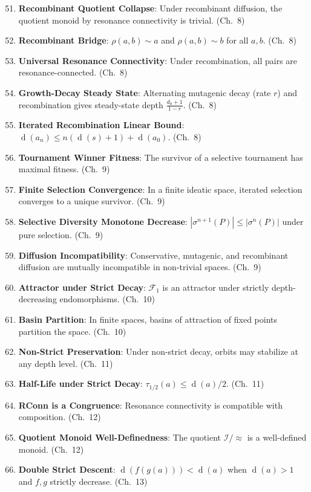 \documentclass[11pt,openany]{book}
\theoremstyle{definition}
\theoremstyle{plain}
\theoremstyle{remark}
\newcommand{\IS}{\mathcal{I}}               %
\newcommand{\res}{\sim}                      %
\newcommand{\depth}{\operatorname{d}}       %
\newcommand{\Filt}[1]{\mathcal{F}_{#1}}     %
\begin{document}
\begin{enumerate}
\setcounter{enumi}{50}
\item \textbf{Recombinant Quotient Collapse}: Under recombinant diffusion, the quotient monoid by resonance connectivity is trivial. (Ch.~8)
\item \textbf{Recombinant Bridge}: $\rho(a,b) \res a$ and $\rho(a,b) \res b$ for all $a, b$. (Ch.~8)
\item \textbf{Universal Resonance Connectivity}: Under recombination, all pairs are resonance-connected. (Ch.~8)
\item \textbf{Growth-Decay Steady State}: Alternating mutagenic decay (rate $r$) and recombination gives steady-state depth $\frac{d_0+1}{1-r}$. (Ch.~8)
\item \textbf{Iterated Recombination Linear Bound}: $\depth(a_n) \leq n(\depth(s)+1) + \depth(a_0)$. (Ch.~8)
\item \textbf{Tournament Winner Fitness}: The survivor of a selective tournament has maximal fitness. (Ch.~9)
\item \textbf{Finite Selection Convergence}: In a finite ideatic space, iterated selection converges to a unique survivor. (Ch.~9)
\item \textbf{Selective Diversity Monotone Decrease}: $|\sigma^{n+1}(P)| \leq |\sigma^n(P)|$ under pure selection. (Ch.~9)
\item \textbf{Diffusion Incompatibility}: Conservative, mutagenic, and recombinant diffusion are mutually incompatible in non-trivial spaces. (Ch.~9)
\item \textbf{Attractor under Strict Decay}: $\Filt{1}$ is an attractor under strictly depth-decreasing endomorphisms. (Ch.~10)
\item \textbf{Basin Partition}: In finite spaces, basins of attraction of fixed points partition the space. (Ch.~10)
\item \textbf{Non-Strict Preservation}: Under non-strict decay, orbits may stabilize at any depth level. (Ch.~11)
\item \textbf{Half-Life under Strict Decay}: $\tau_{1/2}(a) \leq \depth(a)/2$. (Ch.~11)
\item \textbf{RConn is a Congruence}: Resonance connectivity is compatible with composition. (Ch.~12)
\item \textbf{Quotient Monoid Well-Definedness}: The quotient $\IS/{\approx}$ is a well-defined monoid. (Ch.~12)
\item \textbf{Double Strict Descent}: $\depth(f(g(a))) < \depth(a)$ when $\depth(a) > 1$ and $f, g$ strictly decrease. (Ch.~13)

\end{enumerate}
\end{document}
